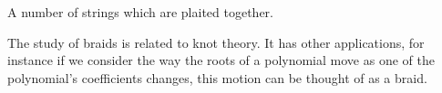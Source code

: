 A number of strings which are plaited together.
\par
The study of braids is related to knot theory. It has other applications,
for instance if we consider the way the roots of a polynomial move
as one of the polynomial's coefficients changes, this motion can
be thought of as a braid.